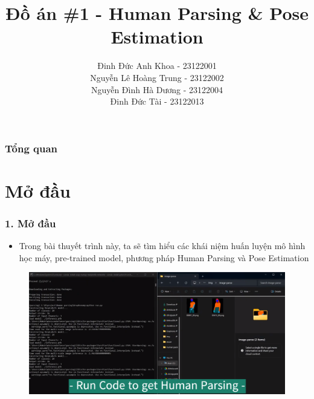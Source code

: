 \documentclass{beamer}
\title[Presentation ]{Đồ án \#1 - Human Parsing \& Pose Estimation
} %
\author{ Đinh Đức Anh Khoa - 23122001 \\ Nguyễn Lê Hoàng Trung - 23122002 \\ Nguyễn Đình Hà Dương - 23122004 \\ Đinh Đức Tài - 23122013
} %
\institute[23TNT1] %
{
FIT@HCMUS \\ %
\medskip
\textit{TPHCM, tháng 12 năm 2023} %
}
\date{} %
\begin{document}
\begin{frame}
\titlepage %
\end{frame}

\begin{frame}
\frametitle{Tổng quan} %
\tableofcontents %
\end{frame}

\section{Mở đầu} 
\begin{frame}
\frametitle{1. Mở đầu}
\begin{itemize}
\item Trong bài thuyết trình này, ta sẽ tìm hiểu các khái niệm huấn luyện mô hình học máy, pre-trained model, phương pháp Human Parsing và Pose Estimation

\end{itemize}

\begin{figure}[h]
\centering\includegraphics[width=1\linewidth]{images/pic1.png}
\end{figure}

\end{frame}
\end{document}
